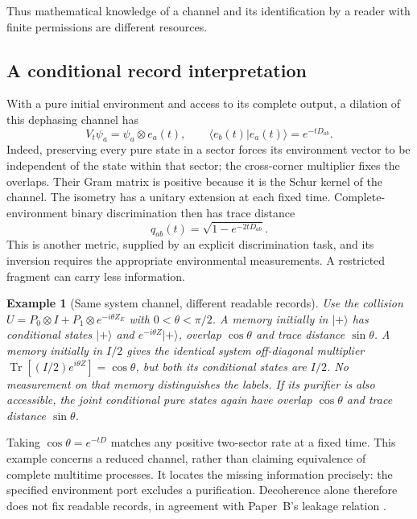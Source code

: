 \documentclass[12pt,a4paper]{article}
\newtheorem{example}[theorem]{Example}
\begin{document}
Thus mathematical knowledge of a channel and its identification by a
reader with finite permissions are different resources.

\subsection{A conditional record interpretation}

With a pure initial environment and access to its complete output,
a dilation of this dephasing channel has
\[
 V_t\psi_a=\psi_a\otimes e_a(t),\qquad
 \langle e_b(t)|e_a(t)\rangle=e^{-tD_{ab}} .
\]
Indeed, preserving every pure state in a sector forces its
environment vector to be independent of the state within that
sector; the cross-corner multiplier fixes the overlaps.
Their Gram matrix is positive because it is the Schur kernel of
the channel. The isometry has a unitary extension at each fixed
time. Complete-environment binary discrimination then has trace
distance
\begin{equation}
 q_{ab}(t)=\sqrt{1-e^{-2tD_{ab}}}.
 \label{eq:rate-record}
\end{equation}
This is another metric, supplied by an explicit discrimination
task, and its inversion requires the appropriate environmental
measurements. A restricted fragment can carry less information.

\begin{example}[Same system channel, different readable records]
\label{ex:purifier-access}
Use the collision
$U=P_0\otimes I+P_1\otimes e^{-i\theta Z_E}$ with
$0<\theta<\pi/2$. A memory initially in $|+\rangle$ has conditional
states $|+\rangle$ and $e^{-i\theta Z}|+\rangle$, overlap
$\cos\theta$ and trace distance $\sin\theta$.
A memory initially in $I/2$ gives the identical system
off-diagonal multiplier
$\operatorname{Tr}[(I/2)e^{i\theta Z}]=\cos\theta$, but both its
conditional states are $I/2$. No measurement on that memory
distinguishes the labels. If its purifier is also accessible,
the joint conditional pure states again have overlap $\cos\theta$
and trace distance $\sin\theta$.
\end{example}

Taking $\cos\theta=e^{-tD}$ matches any positive two-sector rate
at a fixed time. This example concerns a reduced channel, rather
than claiming equivalence of complete multitime processes. It
locates the missing information precisely: the specified
environment port excludes a purification. Decoherence alone
therefore does not fix readable records, in agreement with
Paper~B's leakage relation \cite{Liu2026PaperB}.
\end{document}

